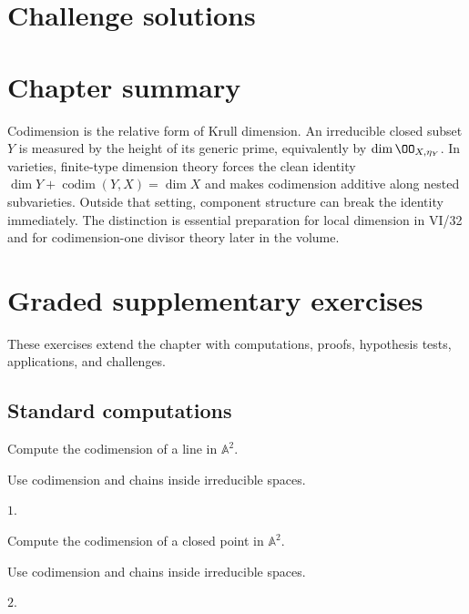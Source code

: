 \ifdefined\IncludeChallengeSolutions
\section{Challenge solutions}

\fi

\section{Chapter summary}\label{sec:vi31-synthesis}
Codimension is the relative form of Krull dimension.  An irreducible closed subset $Y$ is measured by the height of its
generic prime, equivalently by $\dim\OO_{X,\eta_Y}$.  In varieties, finite-type dimension theory forces the clean
identity $\dim Y+\operatorname{codim}(Y,X)=\dim X$ and makes codimension additive along nested subvarieties.  Outside
that setting, component structure can break the identity immediately.  The distinction is essential preparation for
local dimension in VI/32 and for codimension-one divisor theory later in the volume.

\section{Graded supplementary exercises}
These exercises extend the chapter with computations, proofs, hypothesis tests, applications, and challenges.

\subsection*{Standard computations}

\begin{exercise}\label{exr:vi31-expand-01}
Compute the codimension of a line in $\mathbb A^2$.
\end{exercise}
\begin{hint}
Use codimension and chains inside irreducible spaces.
\end{hint}
\begin{solution}
$1$.
\end{solution}

\begin{exercise}\label{exr:vi31-expand-02}
Compute the codimension of a closed point in $\mathbb A^2$.
\end{exercise}
\begin{hint}
Use codimension and chains inside irreducible spaces.
\end{hint}
\begin{solution}
$2$.
\end{solution}

